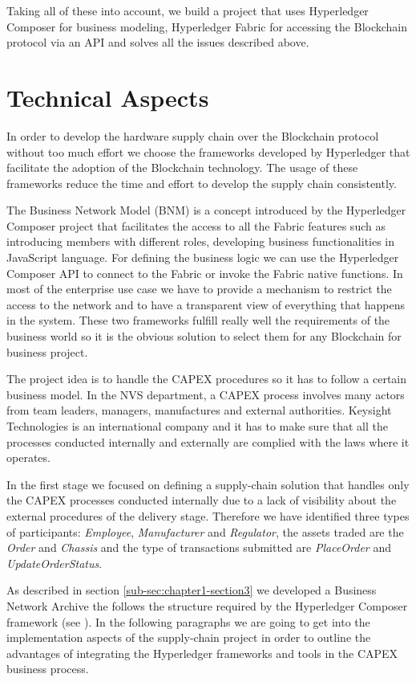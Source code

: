 Taking all of these into account, we build a project that uses Hyperledger Composer for business modeling, Hyperledger Fabric for accessing the Blockchain protocol via an API and solves all the issues described above.


\section{Technical Aspects}
\label{sec:chapter3-section2}
In order to develop the hardware supply chain over the Blockchain protocol without too much effort we choose the frameworks developed by Hyperledger that facilitate the adoption of the Blockchain technology. The usage of these frameworks reduce the time and effort to develop the supply chain consistently.

The Business Network Model (BNM) is a concept introduced by the Hyperledger Composer project that facilitates the access to all the Fabric features such as introducing members with different roles, developing business functionalities in JavaScript language. For defining the business logic we can use the Hyperledger Composer API to connect to the Fabric or invoke the Fabric native functions. In most of the enterprise use case we have to provide a mechanism to restrict the access to the network and to have a transparent view of everything that happens in the system. 
These two frameworks fulfill really well the requirements of the business world so
it is the obvious solution to select them for any Blockchain for business project.

The project idea is to handle the CAPEX procedures so it has to follow a certain business model. In the NVS department, a CAPEX process involves many actors from team leaders, managers, manufactures and external authorities. 
Keysight Technologies is an international company and it has to make sure that all the processes conducted internally and externally are complied with the laws where it operates.

In the first stage we focused on defining a supply-chain solution that handles only the CAPEX processes conducted internally due to a lack of visibility about the external procedures of the delivery stage. 
Therefore we have identified three types of participants: \emph{Employee}, \emph{Manufacturer} and \emph{Regulator}, the assets traded are the \emph{Order} and \emph{Chassis} and the type of transactions submitted are \emph{PlaceOrder} and \emph{UpdateOrderStatus}.

As described in section \ref{sub-sec:chapter1-section3} we developed a Business Network Archive the follows the structure required by the Hyperledger Composer framework (see ). In the following paragraphs we are going to get into the implementation aspects of the supply-chain project in order to outline the advantages of integrating the Hyperledger frameworks and tools in the CAPEX business process. 

